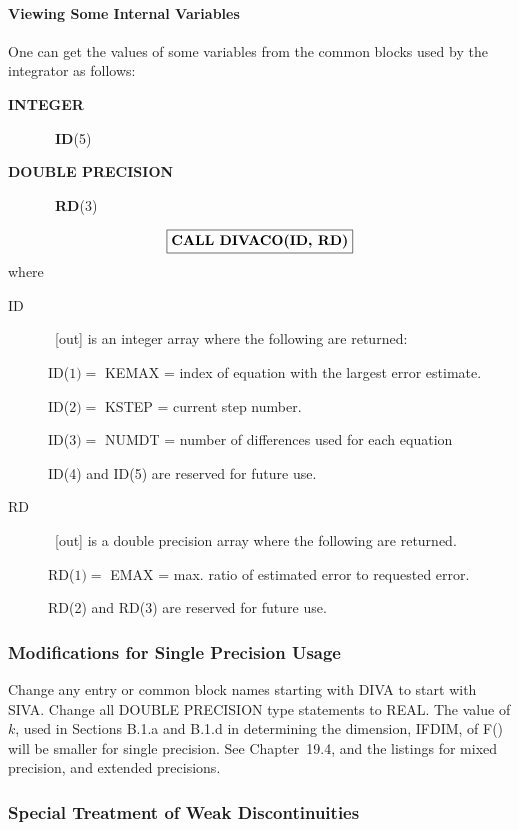 \documentclass[twoside]{MATH77}
\begin{document}
\paragraph{Viewing Some Internal Variables}
One can get the values of some variables from the common blocks used by the
integrator as follows:

\begin{description}
\item[\bf INTEGER]  \ {\bf ID}(5)

\item[\bf DOUBLE PRECISION]  \ {\bf RD}(3)
\end{description}
$$
\fbox{\bf CALL DIVACO(ID, RD)}\vspace{-4pt}
$$
where
\begin{description}
\item[ID]  \ [out] is an integer array where the following are returned:

ID($1)=$ KEMAX = index of equation with the largest error estimate.

ID($2)=$ KSTEP = current step number.

ID($3)=$ NUMDT = number of differences used for each equation

ID(4) and ID(5) are reserved for future use.

\item[RD]  \ [out] is a double precision array where the following
are returned.

RD($1)=$ EMAX = max. ratio of estimated error to requested error.

RD(2) and RD(3) are reserved for future use.
\end{description}

\subsubsection{Modifications for Single Precision Usage\label{Sngl}}

Change any entry or common block names starting with DIVA to start with SIVA.
Change all DOUBLE PRECISION type statements to REAL. The value of $k$, used in
Sections B.1.a and B.1.d in determining the dimension, IFDIM, of F()
will be smaller for single precision.  See Chapter~19.4, and the
listings for mixed precision, and extended precisions.

\subsubsection{Special Treatment of Weak Discontinuities\label{Discon}}
\end{document}
